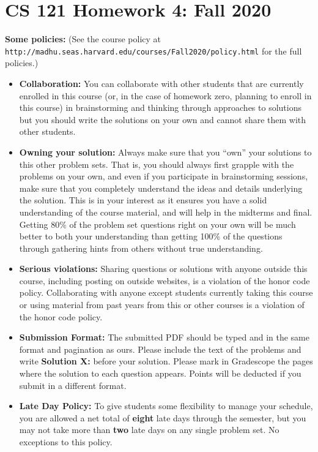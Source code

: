 \documentclass[11pt]{article}
\begin{document}
	
	\section*{CS 121 Homework 4: Fall
		2020}\label{cs-121-homework-zero-fall-2020}
	
	\textbf{Some policies:} (See the course policy at  {\tt http://madhu.seas.harvard.edu/courses/Fall2020/policy.html} for the
	full policies.)
	
	\begin{itemize}
		\item
		{\bf Collaboration:} You can collaborate with other students that are currently enrolled in
		this course (or, in the case of homework zero, planning to enroll in
		this course) in brainstorming and thinking through approaches to
		solutions but you should write the solutions on your own and cannot
		share them with other students. 
		\item
		{\bf Owning your solution:} Always make sure that you ``own'' your solutions to this other problem
		sets. That is, you should always first grapple with the problems on
		your own, and even if you participate in brainstorming sessions, make
		sure that you completely understand the ideas and details underlying
		the solution. This is in your interest as it ensures you have a solid
		understanding of the course material, and will help in the midterms
		and final. Getting 80\% of the problem
		set questions right on your own will be much better to both your
		understanding than getting 100\% of the questions through
		gathering hints from others without true understanding.
		\item
		{\bf Serious violations:} Sharing questions or solutions with anyone outside this course,
		including posting on outside websites, is a violation of the honor
		code policy. Collaborating with anyone except students currently
		taking this course or using material from past years from this or
		other courses is a violation of the honor code policy.
		\item
		{\bf Submission Format:} The submitted PDF should be typed and in the same format and
		pagination as ours. Please include the text of the problems and write
		\textbf{Solution X:} before your solution. Please mark in Gradescope 
		the pages where
		the solution to each question appears. Points will be deducted if you
		submit in a different format.
		\item {\bf Late Day Policy:} To give students some flexibility to manage your schedule, you are allowed a net total of {\bf eight} late days through the semester, but you may not take more than {\bf two} late days on any single problem set. No exceptions to this policy. 
	\end{itemize}
	
\end{document}
